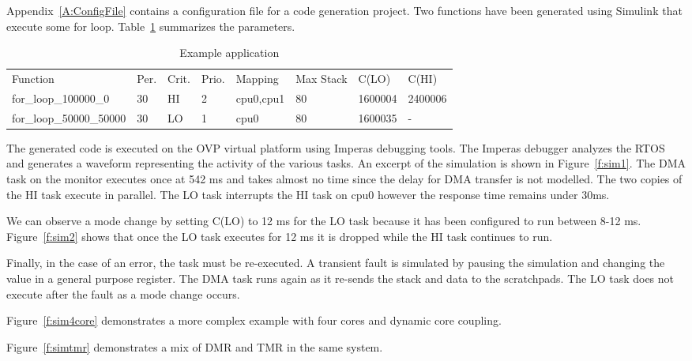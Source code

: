 	Appendix~\ref{A:ConfigFile} contains a configuration file for a code generation project. 
	Two functions have been generated using Simulink that execute some for loop. Table~\ref{t:config} summarizes the parameters.
	
	
	

\begin{table}[h]
\caption{Example application}
\centering

	\begin{tabular}{@{}llllllll@{}}
	\toprule
	Function & Per. & Crit. & Prio. & Mapping & Max Stack & C(LO) & C(HI) 	 \\
	for\_loop\_100000\_0 & 30 & HI & 2 & cpu0,cpu1 & 80 & 1600004 & 2400006 \\
	for\_loop\_50000\_50000 & 30 & LO & 1 & cpu0 & 80 & 1600035 & - \\
	\end{tabular}

\label{t:config}
\end{table}
	

	The generated code is executed on the OVP virtual platform using Imperas debugging tools. The Imperas debugger analyzes the RTOS and generates a waveform representing the activity of the various tasks. 
	An excerpt of the simulation is shown in Figure~\ref{f:sim1}.
	The DMA task on the monitor executes once at 542 ms and takes almost no time since the delay for DMA transfer is not modelled.
	The two copies of the HI task execute in parallel. The LO task interrupts the HI task on cpu0 however the response time remains under 30ms.
	
	We can observe a mode change by setting C(LO) to 12 ms for the LO task because it has been configured to run between 8-12 ms. 
	Figure~\ref{f:sim2} shows that once the LO task executes for 12 ms it is dropped while the HI task continues to run.
	 
		
	Finally, in the case of an error, the task must be re-executed. 
	A transient fault is simulated by pausing the simulation and changing the value in a general purpose register. 
	The DMA task runs again as it re-sends the stack and data to the scratchpads.
	The LO task does not execute after the fault as a mode change occurs.
	
		 


Figure~\ref{f:sim4core} demonstrates a more complex example with four cores and dynamic core coupling.


Figure~\ref{f:simtmr} demonstrates a mix of DMR and TMR in the same system.


